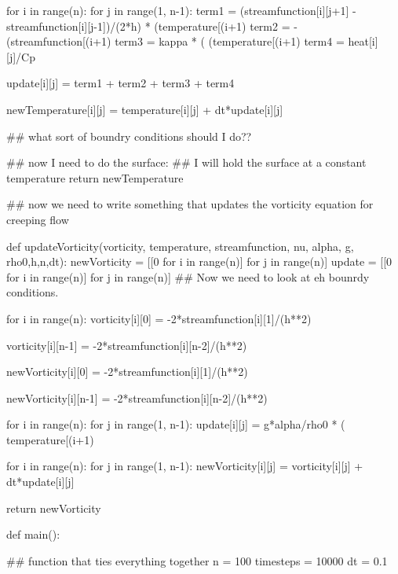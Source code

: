 	for i in range(n):
		for j in range(1, n-1):
			term1 = (streamfunction[i][j+1] - streamfunction[i][j-1])/(2*h) * (temperature[(i+1)%
			term2 = - (streamfunction[(i+1)%
			term3 = kappa * (  (temperature[(i+1)%
			term4 = heat[i][j]/Cp
			
			update[i][j] = term1 + term2 + term3 + term4
			
			newTemperature[i][j] = temperature[i][j] + dt*update[i][j]
			
			
	## what sort of boundry conditions should I do??
	

	
	## now I need to do the surface:
	## I will hold the surface at a constant temperature		
	return newTemperature
	
## now we need to write something that updates the vorticity equation for creeping flow

def updateVorticity(vorticity, temperature, streamfunction, nu, alpha, g, rho0,h,n,dt):
	newVorticity = [[0 for i in range(n)] for j in range(n)]
	update = [[0 for i in range(n)] for j in range(n)]	
	## Now we need to look at eh bounrdy conditions.
	
	for i in range(n):
		vorticity[i][0] = -2*streamfunction[i][1]/(h**2) 
		
		vorticity[i][n-1] = -2*streamfunction[i][n-2]/(h**2)
		
		newVorticity[i][0] = -2*streamfunction[i][1]/(h**2)
		
		newVorticity[i][n-1] = -2*streamfunction[i][n-2]/(h**2)
		
		

	for i in range(n):
		for j in range(1, n-1):
			update[i][j] = g*alpha/rho0 * ( temperature[(i+1)%
			
	
	for i in range(n):
		for j in range(1, n-1):
			newVorticity[i][j] = vorticity[i][j] + dt*update[i][j]
		
	return  newVorticity
	
	
	
def main():

	## function that ties everything together
	n = 100
	timesteps = 10000
	dt = 0.1
	
